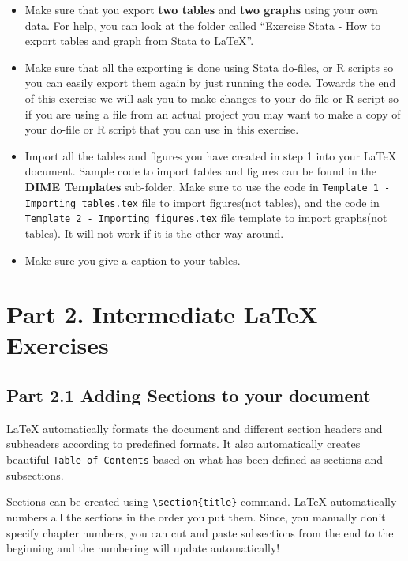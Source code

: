 \documentclass[12pts]{report}
\begin{document}
\begin{itemize}
	\item Make sure that you export \textbf{two tables} and \textbf{two graphs} using your own data. For help, you can look at the folder called ``Exercise Stata - How to export tables and graph from Stata to LaTeX''.
	\item Make sure that all the exporting is done using Stata do-files, or R scripts so you can easily export them again by just running the code. Towards the end of this exercise we will ask you to make changes to your do-file or R script so if you are using a file from an actual project you may want to make a copy of your do-file or R script that you can use in this exercise.
	\item Import all the tables and figures you have created in step 1 into your {\LaTeX} document. Sample code to import tables and figures can be found in the \textbf{DIME Templates} sub-folder. Make sure to use the  code in \texttt{Template 1 - Importing tables.tex} file to import figures(not tables), and the code in \texttt{Template 2 - Importing figures.tex} file template to import graphs(not tables). It will not work if it is the other way around.
	\item Make sure you give a caption to your tables. 
\end{itemize}

\section*{Part 2. Intermediate {\LaTeX} Exercises}
\subsection*{Part 2.1 Adding Sections to your document}
{\LaTeX} automatically formats the document and different section headers and subheaders according to predefined formats. It also automatically creates beautiful \texttt{Table of Contents} based on what has been defined as sections and subsections. 

Sections can be created using \verb|\section{title}| command. {\LaTeX} automatically numbers all the sections in the order you put them. Since, you manually don't specify chapter numbers, you can cut and paste subsections from the end to the beginning and the numbering will update automatically! 
\end{document}
